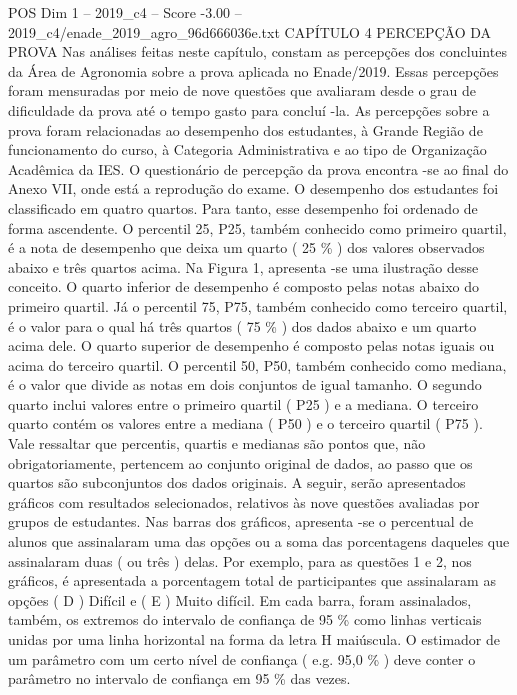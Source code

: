 \begin{textsample}{POS Dim 1 – 2019\_c4 – Score -3.00 – 2019\_c4/enade\_2019\_agro\_96d666036e.txt}  \label{ex:f1_pos_341}
CAPÍTULO 4 PERCEPÇÃO DA PROVA Nas análises feitas neste capítulo, constam as percepções dos concluintes da Área de Agronomia sobre a prova aplicada no Enade/2019.
Essas percepções foram mensuradas por meio de nove questões que avaliaram desde o grau de dificuldade da prova até o tempo gasto para concluí -la.
As percepções sobre a prova foram relacionadas ao desempenho dos estudantes, à Grande Região de funcionamento do curso, à Categoria Administrativa e ao tipo de Organização Acadêmica da IES.
O questionário de percepção da prova encontra -se ao final do Anexo VII, onde está a reprodução do exame.
O desempenho dos estudantes foi classificado em quatro quartos.
Para tanto, esse desempenho foi ordenado de forma ascendente.
O percentil 25, P25, também conhecido como primeiro quartil, é a nota de desempenho que deixa um quarto ( 25 \% ) dos valores observados abaixo e três quartos acima.
Na Figura 1, apresenta -se uma ilustração desse conceito.
O quarto inferior de desempenho é composto pelas notas abaixo do primeiro quartil.
Já o percentil 75, P75, também conhecido como terceiro quartil, é o valor para o qual há três quartos ( 75 \% ) dos dados abaixo e um quarto acima dele.
O quarto superior de desempenho é composto pelas notas iguais ou acima do terceiro quartil.
O percentil 50, P50, também conhecido como mediana, é o valor que divide as notas em dois conjuntos de igual tamanho.
O segundo quarto inclui valores entre o primeiro quartil ( P25 ) e a mediana.
O terceiro quarto contém os valores entre a mediana ( P50 ) e o terceiro quartil ( P75 ).
Vale ressaltar que percentis, quartis e medianas são pontos que, não obrigatoriamente, pertencem ao conjunto original de dados, ao passo que os quartos são subconjuntos dos dados originais.
A seguir, serão apresentados gráficos com resultados selecionados, relativos às nove questões avaliadas por grupos de estudantes.
Nas barras dos gráficos, apresenta -se o percentual de alunos que assinalaram uma das opções ou a soma das porcentagens daqueles que assinalaram duas ( ou três ) delas.
Por exemplo, para as questões 1 e 2, nos gráficos, é apresentada a porcentagem total de participantes que assinalaram as opções ( D ) Difícil e ( E ) Muito difícil.
Em cada barra, foram assinalados, também, os extremos do intervalo de confiança de 95 \% como linhas verticais unidas por uma linha horizontal na forma da letra H maiúscula.
O estimador de um parâmetro com um certo nível de confiança ( e.g. 95,0 \% ) deve conter o parâmetro no intervalo de confiança em 95 \% das vezes.

\end{textsample}
